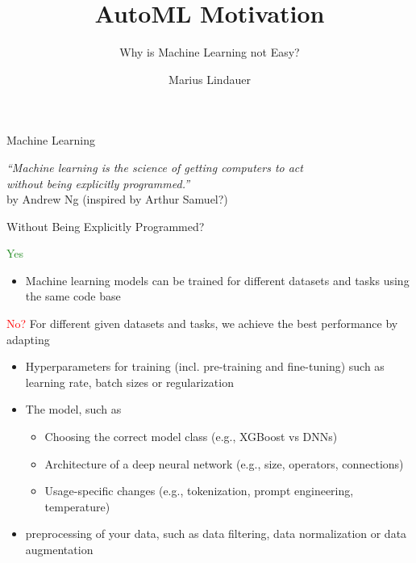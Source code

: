 \documentclass[main]{subfiles}
\title[AutoML: Introduction]{AutoML Motivation}
\subtitle{Why is Machine Learning not Easy?}
\author[Marius Lindauer]{Marius Lindauer}
\date{}
\begin{document}
	
	\maketitle
	

\begin{frame}[c]{Machine Learning}

\centering
\textit{``Machine learning is the science of getting computers to act\\
 without being explicitly programmed.''}\\[2em]

\hfill by Andrew Ng (inspired by Arthur Samuel?)

\end{frame}
\begin{frame}[c]{Without Being Explicitly Programmed?}

\textcolor{ForestGreen}{Yes}
\begin{itemize}
    \item[$\to$] Machine learning models can be trained for different datasets and tasks using the same code base
\end{itemize}

\bigskip

\pause

\textcolor{red}{No?}
For different given datasets and tasks, we achieve the best performance by adapting
\begin{itemize}
    \item[$\to$] Hyperparameters for training (incl. pre-training and fine-tuning) such as learning rate, batch sizes or regularization
    \pause
    \item[$\to$] The model, such as
    \begin{itemize}
        \item Choosing the correct model class (e.g., XGBoost vs DNNs)
        \item Architecture of a deep neural network (e.g., size, operators, connections)
        \item Usage-specific changes (e.g., tokenization, prompt engineering, temperature)
    \end{itemize}
    \pause
    \item[$\to$] preprocessing of your data, such as data filtering, data normalization or data augmentation
\end{itemize}

\end{frame}
\end{document}
